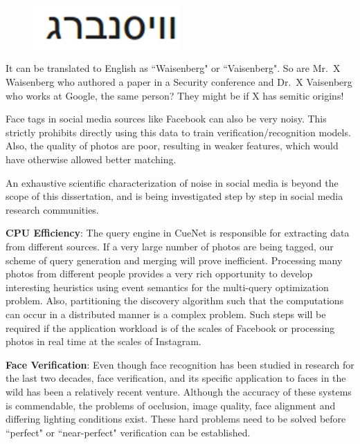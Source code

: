 \begin{figure}[h]
\centering
\includegraphics[width=0.5\textwidth]{media/ronen.png}
\label{fig:exp-general-loc-cx}
\end{figure}

It can be translated to English as ``Waisenberg" or ``Vaisenberg". So are Mr.\ X Waisenberg who authored a paper in a Security conference and Dr.\ X Vaisenberg who works at Google, the same person? They might be if X has semitic origins!

Face tags in social media sources like Facebook can also be very noisy. This strictly prohibits directly using this data to train verification/recognition models. Also, the quality of photos are poor, resulting in weaker features, which would have otherwise allowed better matching. 

An exhaustive scientific characterization of noise in social media is beyond the scope of this dissertation, and is being investigated step by step in social media research communities.

\textbf{\textbf{CPU Efficiency}}: The query engine in CueNet is responsible for extracting data from different sources. If a very large number of photos are being tagged, our scheme of query generation and merging will prove inefficient. Processing many photos from different people provides a very rich opportunity to develop interesting heuristics using event semantics for the multi-query optimization problem. Also, partitioning the discovery algorithm such that the computations can occur in a distributed manner is a complex problem. Such steps will be required if the application workload is of the scales of Facebook or processing photos in real time at the scales of Instagram.

\textbf{\textbf{Face Verification}}: Even though face recognition has been studied in research for the last two decades, face verification, and its specific application to faces in the wild has been a relatively recent venture. Although the accuracy of these systems is commendable, the problems of occlusion, image quality, face alignment and differing lighting conditions exist. These hard problems need to be solved before ``perfect" or ``near-perfect" verification can be established. 

